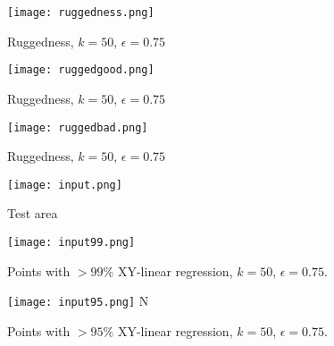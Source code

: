 \documentclass[a4paper,11pt,twoside]{article}
\theoremstyle{definition}
\theoremstyle{remark}
\begin{document}
\newpage
\newpage
\begin{figure}[!h]
  \caption{Ruggedness, $k=50$, $\epsilon = 0.75$}
  \centering
    \texttt{[image: ruggedness.png]}
    \label{ruggedness}
\end{figure}
\begin{figure}[!h]
  \caption{Ruggedness, $k=50$, $\epsilon = 0.75$}
  \centering
    \texttt{[image: ruggedgood.png]}
    \label{ruggedgood}
\end{figure}
\newpage
\begin{figure}[!h]
  \caption{Ruggedness, $k=50$, $\epsilon = 0.75$}
  \centering
    \texttt{[image: ruggedbad.png]}
    \label{ruggedbad}
\end{figure}
\begin{figure}[!h]
  \caption{Test area}
  \centering
    \texttt{[image: input.png]}
    \label{input}
\end{figure}
\newpage
\begin{figure}[!h]
  \caption{Points with $>99\%$ XY-linear regression, $k=50$, $\epsilon = 0.75$.}
  \centering
    \texttt{[image: input99.png]}
    \label{input99}
\end{figure}
\begin{figure}[!h]
  \caption{Points with $>95\%$ XY-linear regression, $k=50$, $\epsilon = 0.75$.}
  \centering
    \texttt{[image: input95.png]}
    \label{input95}N
\end{figure}
\newpage
\end{document}

